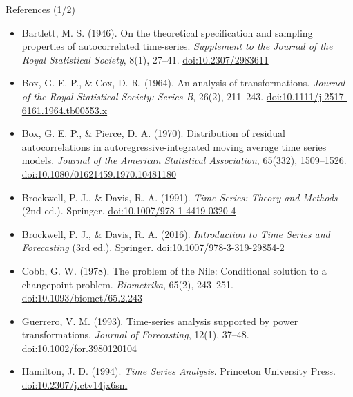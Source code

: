 \begin{frame}{References (1/2)}
\itemsize{\scriptsize}
\begin{itemize}
    \item Bartlett, M. S. (1946). On the theoretical specification and sampling properties of autocorrelated time-series. \textit{Supplement to the Journal of the Royal Statistical Society}, 8(1), 27--41. \href{https://doi.org/10.2307/2983611}{doi:10.2307/2983611}
    \item Box, G. E. P., \& Cox, D. R. (1964). An analysis of transformations. \textit{Journal of the Royal Statistical Society: Series B}, 26(2), 211--243. \href{https://doi.org/10.1111/j.2517-6161.1964.tb00553.x}{doi:10.1111/j.2517-6161.1964.tb00553.x}
    \item Box, G. E. P., \& Pierce, D. A. (1970). Distribution of residual autocorrelations in autoregressive-integrated moving average time series models. \textit{Journal of the American Statistical Association}, 65(332), 1509--1526. \href{https://doi.org/10.1080/01621459.1970.10481180}{doi:10.1080/01621459.1970.10481180}
    \item Brockwell, P. J., \& Davis, R. A. (1991). \textit{Time Series: Theory and Methods} (2nd ed.). Springer. \href{https://doi.org/10.1007/978-1-4419-0320-4}{doi:10.1007/978-1-4419-0320-4}
    \item Brockwell, P. J., \& Davis, R. A. (2016). \textit{Introduction to Time Series and Forecasting} (3rd ed.). Springer. \href{https://doi.org/10.1007/978-3-319-29854-2}{doi:10.1007/978-3-319-29854-2}
    \item Cobb, G. W. (1978). The problem of the Nile: Conditional solution to a changepoint problem. \textit{Biometrika}, 65(2), 243--251. \href{https://doi.org/10.1093/biomet/65.2.243}{doi:10.1093/biomet/65.2.243}
    \item Guerrero, V. M. (1993). Time-series analysis supported by power transformations. \textit{Journal of Forecasting}, 12(1), 37--48. \href{https://doi.org/10.1002/for.3980120104}{doi:10.1002/for.3980120104}
    \item Hamilton, J. D. (1994). \textit{Time Series Analysis}. Princeton University Press. \href{https://doi.org/10.2307/j.ctv14jx6sm}{doi:10.2307/j.ctv14jx6sm}
\end{itemize}
\end{frame}

